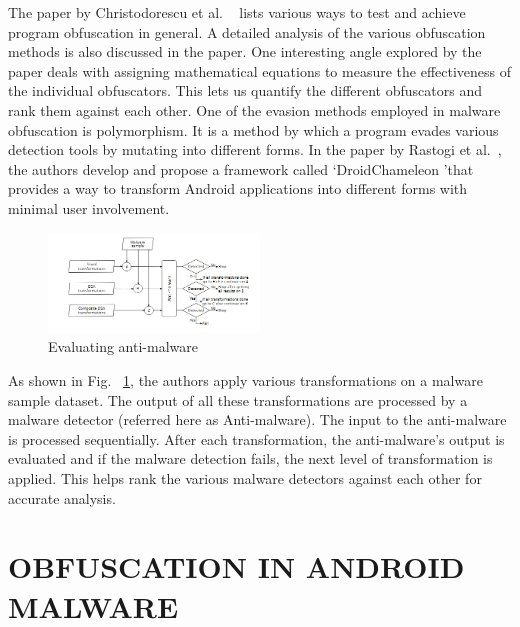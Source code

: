 The paper by Christodorescu et al. ~\cite{Christodorescu} lists various ways to test and achieve program obfuscation in general. A detailed analysis of the various obfuscation methods is also discussed in the paper. One interesting angle explored by the paper deals with assigning mathematical equations to measure the effectiveness of the individual obfuscators. This lets us quantify the different obfuscators and rank them against each other.
One of the evasion methods employed in malware obfuscation is polymorphism. It is a method by which a program evades various detection tools by mutating into different forms. In the paper by Rastogi et al.~\cite{rastogi}, the authors develop and propose a framework called \textquoteleft DroidChameleon \textquoteright that provides a way to transform Android applications into different forms with minimal user involvement. 

\begin{figure}[htb]
	\centering
	\includegraphics[width=0.5\textwidth]{evalFigure1.jpg}
	\caption{Evaluating anti-malware} 
	\label{fig:eval}
\end{figure}

As shown in Fig. ~\ref{fig:eval}, the authors apply various transformations on a malware sample dataset. The output of all these transformations are processed by a malware detector (referred here as Anti-malware).  The input to the anti-malware is processed sequentially. After each transformation, the anti-malware’s output is evaluated and if the malware detection fails, the next level of transformation is applied. This helps rank the various malware detectors against each other for accurate analysis.

\section{OBFUSCATION IN ANDROID MALWARE}

